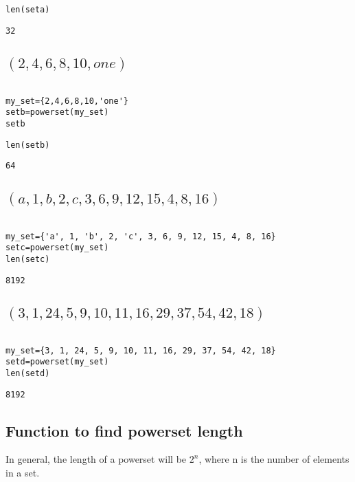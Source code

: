 \documentclass[11pt]{article}
\begin{document}
\begin{verbatim}
len(seta)
\end{verbatim}
\begin{verbatim}
32
\end{verbatim}

\subsection{\((2,4,6,8,10,one)\)}
\label{sec:org17f22cf}
\begin{verbatim}

my_set={2,4,6,8,10,'one'}
setb=powerset(my_set)
setb
\end{verbatim}

\begin{verbatim}
len(setb)
\end{verbatim}

\begin{verbatim}
64
\end{verbatim}

\subsection{\((a, 1, b, 2, c, 3, 6, 9, 12, 15, 4, 8, 16)\)}
\label{sec:org8795b36}

\begin{verbatim}

my_set={'a', 1, 'b', 2, 'c', 3, 6, 9, 12, 15, 4, 8, 16}
setc=powerset(my_set)
len(setc)

\end{verbatim}

\begin{verbatim}
8192
\end{verbatim}

\subsection{\((3, 1, 24, 5, 9, 10, 11, 16, 29, 37, 54, 42, 18)\)}
\label{sec:orga9bd081}

\begin{verbatim}

my_set={3, 1, 24, 5, 9, 10, 11, 16, 29, 37, 54, 42, 18}
setd=powerset(my_set)
len(setd)

\end{verbatim}

\begin{verbatim}
8192
\end{verbatim}

\subsection{Function to find powerset length}
\label{sec:orgf78f8ce}
In general, the length of a powerset will be \(2^{n}\), where n is the number of elements in a set.
\end{document}
